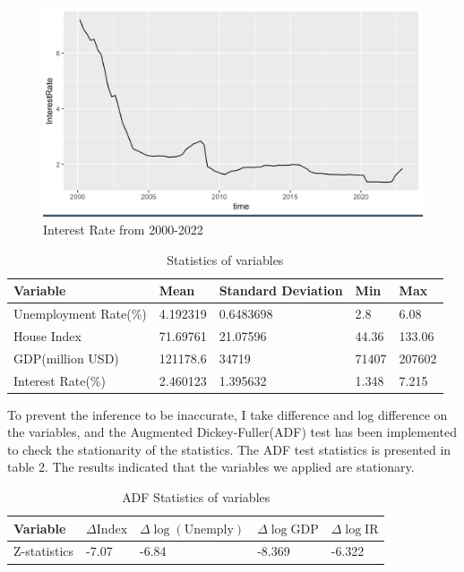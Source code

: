 \documentclass[12pt]{article}
\begin{document}
\begin{spacing}{2}
\begin{figure}[H] %
\centering %
\includegraphics[width=1\textwidth]{截圖 2023-06-06 下午3.11.29.png} %
\caption{Interest Rate from 2000-2022} %
\label{Fig.main4} %
\end{figure}



\begin{table}[h!]
\centering
\begin{tabular}{|l|l|l|l|l|}
\hline
Variable              & Mean     & Standard Deviation & Min   & Max    \\ \hline
Unemployment Rate(\%) & 4.192319 & 0.6483698          & 2.8   & 6.08   \\ \hline
House Index           & 71.69761 & 21.07596           & 44.36 & 133.06 \\ \hline
GDP(million USD)      & 121178.6 & 34719              & 71407 & 207602 \\ \hline
Interest Rate(\%)     & 2.460123 &  1.395632            &  1.348    & 7.215   \\ \hline
\end{tabular}
\caption{Statistics of variables}
\label{table:1}
\end{table}
To prevent the inference to be inaccurate, I take difference and log difference on the variables, and the Augmented Dickey-Fuller(ADF) test has been implemented to check the stationarity of the statistics. The ADF test statistics is presented in table 2. The results indicated that the variables we applied are stationary.
\begin{table}[h!]
\centering
\begin{tabular}{|l|l|l|l|l|}
\hline
Variable&$\Delta{\mathrm{Index}}$& $\Delta{\mathrm{\log(Unemply)}}$ &$\Delta{\log\mathrm{GDP}}$&$\Delta{\log\mathrm{IR}}$    \\ \hline
Z-statistics& -7.07 & -6.84& -8.369&  -6.322   \\ \hline
\end{tabular}
\caption{ADF Statistics of variables}
\label{table:2}
\end{table}
\newpage

\end{spacing}
\end{document}
